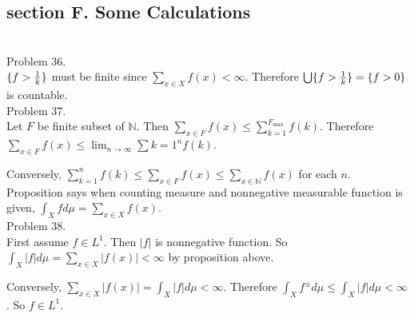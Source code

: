 \subsection*{section F. Some Calculations} \hfill \\

Problem 36. \\

$\{ f > {1 \over k} \}$ must be finite since $\sum_{x\in X}f(x) < \infty$. Therefore $\bigcup \{ f > {1 \over k} \} = \{ f > 0 \}  $ is countable. \\

Problem 37. \\

Let $F$ be finite subset of $\mathbb{N}$. Then $\sum_{x\in F} f(x) \leq \sum_{k=1}^{F_{\text{max} } } f(k) $. Therefore $\sum_{x\in F} f(x) \leq \lim_{n\rightarrow \infty } \sum{k=1}^{n}f(k)$.

Conversely, $\sum_{k=1}^{n}f(k) \leq \sum_{x\in F}f(x) \leq \sum_{x\in \mathbb{N}}f(x)$ for each $n$. \\

Proposition says when counting measure and nonnegative measurable function is given, $\int_{X}f d\mu = \sum_{x\in X}f(x)$. \\

Problem 38. \\

First assume $f \in L^1$. Then $\left| f  \right |$ is nonnegative function. So $\int_{X} \left | f  \right | d\mu = \sum_{x\in X} \left| f(x)  \right | < \infty$ by proposition above.

Conversely, $\sum_{x\in X} \left | f(x)  \right | = \int_{X} \left| f  \right | d\mu < \infty$. Therefore $\int_{X} f^{\pm} d\mu \leq \int_{X}\left | f  \right | d\mu < \infty$. So $f \in L^1$.\\


